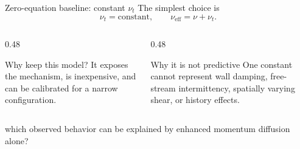 \documentclass[aspectratio=169,11pt]{beamer}
\begin{document}
\begin{frame}{Zero-equation baseline: constant $\nu_t$}
The simplest choice is
\[
  \nu_t=\text{constant},
  \qquad
  \nu_{\mathrm{eff}}=\nu+\nu_t.
\]

\begin{columns}[T,onlytextwidth]
\begin{column}{0.48\textwidth}
\begin{block}{Why keep this model?}
It exposes the mechanism, is inexpensive, and can be calibrated for a narrow configuration.
\end{block}
\end{column}
\begin{column}{0.48\textwidth}
\begin{alertblock}{Why it is not predictive}
One constant cannot represent wall damping, free-stream intermittency, spatially varying shear, or history effects.
\end{alertblock}
\end{column}
\end{columns}

\vspace{0.6em}
 which observed behavior can be explained by enhanced momentum diffusion alone?
\end{frame}
\end{document}
